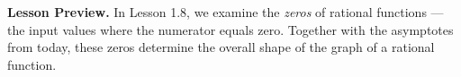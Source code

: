 \documentclass[10pt]{article}
\begin{document}
\vspace{0.1in}

\begin{reflectionbox}
\textbf{Lesson Preview.} In Lesson 1.8, we examine the \textit{zeros} of rational functions ---
the input values where the numerator equals zero.  Together with the asymptotes from today,
these zeros determine the overall shape of the graph of a rational function.
\end{reflectionbox}
\end{document}
